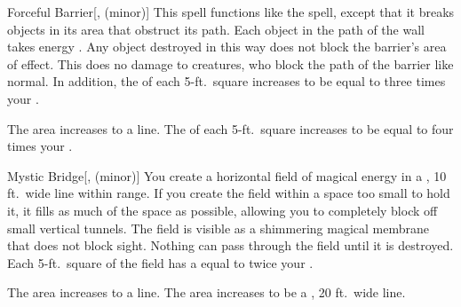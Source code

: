 \lowercase{\hypertarget{spell:Forceful Barrier}{}}\label{spell:Forceful Barrier}
\begin{freeability}[Rank 3]{\hypertarget{spell:Forceful Barrier}{Forceful Barrier}}[,  (minor)]
\targetrule
This spell functions like the  spell, except that it breaks objects in its area that obstruct its path.
Each object in the path of the wall takes energy .
Any object destroyed in this way does not block the barrier's area of effect.
This does no damage to creatures, who block the path of the barrier like normal.
In addition, the  of each 5-ft.\ square increases to be equal to three times your .

\rankline
{} The area increases to a \arealarge line.
 The  of each 5-ft.\ square increases to be equal to four times your .
\end{freeability}
\vspace{0.25em}



\lowercase{\hypertarget{spell:Mystic Bridge}{}}\label{spell:Mystic Bridge}
\begin{freeability}[Rank 3]{\hypertarget{spell:Mystic Bridge}{Mystic Bridge}}[,  (minor)]
\targetrule
You create a horizontal field of magical energy in a \areamed, 10 ft.\ wide line within \rngmed range.
If you create the field within a space too small to hold it, it fills as much of the space as possible, allowing you to completely block off small vertical tunnels.
The field is visible as a shimmering magical membrane that does not block sight.
Nothing can pass through the field until it is destroyed.
Each 5-ft.\ square of the field has a  equal to twice your .

\rankline
{} The area increases to a \arealarge line.
 The area increases to be a \areahuge, 20 ft.\ wide line.
\end{freeability}
\vspace{0.25em}



